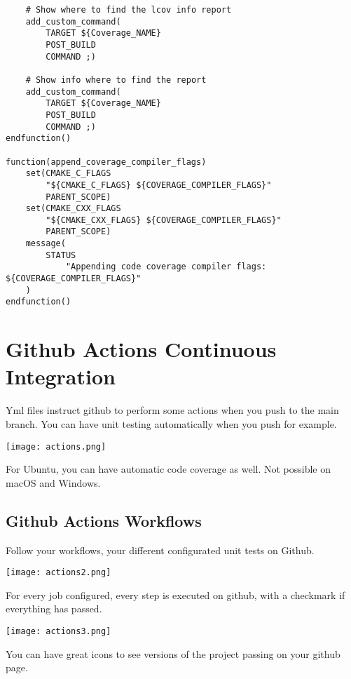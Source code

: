 \begin{verbatim}
    # Show where to find the lcov info report
    add_custom_command(
        TARGET ${Coverage_NAME}
        POST_BUILD
        COMMAND ;)

    # Show info where to find the report
    add_custom_command(
        TARGET ${Coverage_NAME}
        POST_BUILD
        COMMAND ;)
endfunction()

function(append_coverage_compiler_flags)
    set(CMAKE_C_FLAGS
        "${CMAKE_C_FLAGS} ${COVERAGE_COMPILER_FLAGS}"
        PARENT_SCOPE)
    set(CMAKE_CXX_FLAGS
        "${CMAKE_CXX_FLAGS} ${COVERAGE_COMPILER_FLAGS}"
        PARENT_SCOPE)
    message(
        STATUS
            "Appending code coverage compiler flags: ${COVERAGE_COMPILER_FLAGS}"
    )
endfunction()
\end{verbatim}


\section{Github Actions Continuous Integration}

Yml files instruct github to perform some actions when you push to the main branch. 
You can have unit testing automatically when you push for example.


\begin{center}
    \texttt{[image: actions.png]}
\end{center}

For Ubuntu, you can have automatic code coverage as well. Not possible on macOS and Windows.


\subsection{Github Actions Workflows}

Follow your workflows, your different configurated unit tests on Github.


\begin{center}
    \texttt{[image: actions2.png]}
\end{center}

For every job configured, every step is executed on github, with a checkmark if everything has passed.


\begin{center}
    \texttt{[image: actions3.png]}
\end{center}

You can have great icons to see versions of the project passing on your github page.


